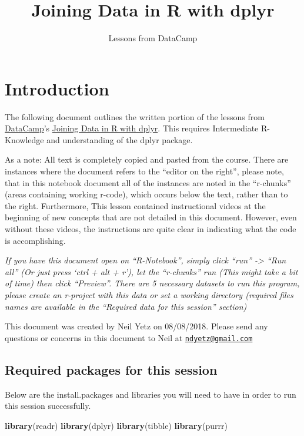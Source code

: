 \documentclass[]{article}
\title{Joining Data in R with dplyr}
\subtitle{Lessons from DataCamp}
\author{}
\date{}
\newenvironment{Shaded}{\begin{snugshade}}{\end{snugshade}}
\newcommand{\KeywordTok}[1]{\textcolor[rgb]{0.13,0.29,0.53}{\textbf{#1}}}
\newcommand{\NormalTok}[1]{#1}
\begin{document}
\maketitle

{
\setcounter{tocdepth}{3}
\tableofcontents
}
\section{Introduction}\label{introduction}

The following document outlines the written portion of the lessons from
\href{https://www.datacamp.com/}{DataCamp}'s
\href{https://www.datacamp.com/courses/joining-data-in-r-with-dplyr}{Joining
Data in R with dplyr}. This requires Intermediate R-Knowledge and
understanding of the dplyr package.

As a note: All text is completely copied and pasted from the course.
There are instances where the document refers to the ``editor on the
right'', please note, that in this notebook document all of the
instances are noted in the ``r-chunks'' (areas containing working
r-code), which occurs below the text, rather than to the right.
Furthermore, This lesson contained instructional videos at the beginning
of new concepts that are not detailed in this document. However, even
without these videos, the instructions are quite clear in indicating
what the code is accomplishing.

\emph{If you have this document open on ``R-Notebook'', simply click
``run'' -\textgreater{} ``Run all'' (Or just press `ctrl + alt + r'),
let the ``r-chunks'' run (This might take a bit of time) then click
``Preview''. There are 5 necessary datasets to run this program, please
create an r-project with this data or set a working directory (required
files names are available in the ``Required data for this session''
section)}

This document was created by Neil Yetz on 08/08/2018. Please send any
questions or concerns in this document to Neil at
\href{mailto:ndyetz@gmail.com}{\nolinkurl{ndyetz@gmail.com}}

\subsection{Required packages for this
session}\label{required-packages-for-this-session}

Below are the install.packages and libraries you will need to have in
order to run this session successfully.

\begin{Shaded}
\begin{Highlighting}[]
\KeywordTok{library}\NormalTok{(readr)}
\KeywordTok{library}\NormalTok{(dplyr)}
\KeywordTok{library}\NormalTok{(tibble)}
\KeywordTok{library}\NormalTok{(purrr)}
\end{Highlighting}
\end{Shaded}
\end{document}

